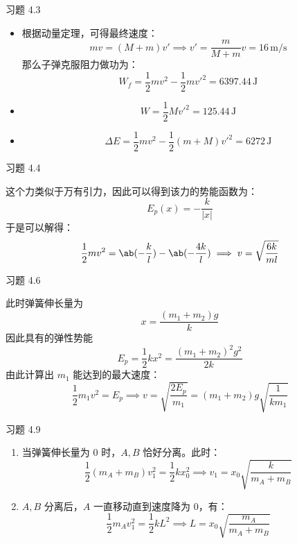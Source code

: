 \begin{problem}
    习题 4.3
    \begin{solution}
        \begin{itemize}
            \item[\textbf{1)}] 根据动量定理，可得最终速度：
            $$
            m v = (M + m) v' \implies v' = \frac{m}{M + m} v = 16\,\mathrm{m / s}
            $$
            那么子弹克服阻力做功为：
            $$
            W_f = \frac{1}{2} m v^2 - \frac{1}{2} m v'^2 = 6397.44\,\mathrm{J}
            $$
            \item[\textbf{2)}]
            $$
            W = \frac{1}{2} M v'^2 = 125.44\,\mathrm{J}
            $$
            \item[\textbf{3)}]
            $$
            \Delta E = \frac{1}{2} m v^2 - \frac{1}{2}(m + M) v'^2 = 6272\,\mathrm{J}
            $$
        \end{itemize}
    \end{solution}
\end{problem}

\begin{problem}
    习题 4.4
    \begin{solution}
        这个力类似于万有引力，因此可以得到该力的势能函数为：
        $$
        E_p(x) = -\frac{k}{|x|}
        $$
        于是可以解得：
        $$
        \frac{1}{2} m v^2 = \ab(-\frac{k}{l}) - \ab(-\frac{4k}{l}) \implies v = \sqrt{\frac{6k}{m l}}
        $$
    \end{solution}
\end{problem}

\begin{problem}
    习题 4.6
    \begin{solution}
        此时弹簧伸长量为
        $$
        x = \frac{(m_1 + m_2)g}{k}
        $$
        因此具有的弹性势能
        $$
        E_p = \frac{1}{2} k x^2 = \frac{(m_1 + m_2)^2 g^2}{2 k}
        $$
        由此计算出 $m_1$ 能达到的最大速度：
        $$
        \frac{1}{2} m_1 v^2 = E_p \implies v = \sqrt{\frac{2 E_p}{m_1}} = (m_1 + m_2) g \sqrt{\frac{1}{k m_1}}
        $$
    \end{solution}
\end{problem}

\begin{problem}
    习题 4.9
    \begin{solution}
        \begin{enumerate}
            \item[\textbf{1)}] 当弹簧伸长量为 $0$ 时，$A, B$ 恰好分离。此时：
            $$
            \frac{1}{2} (m_A + m_B) v_1^2 = \frac{1}{2} k x_0^2 \implies v_1 = x_0 \sqrt{\frac{k}{m_A + m_B}}
            $$
            \item[\textbf{2)}] $A, B$ 分离后，$A$ 一直移动直到速度降为 $0$，有：
            $$
            \frac{1}{2} m_A v_1^2 = \frac{1}{2} k L^2 \implies L = x_0 \sqrt{\frac{m_A}{m_A + m_B}}
            $$
        \end{enumerate}
    \end{solution}
\end{problem}


